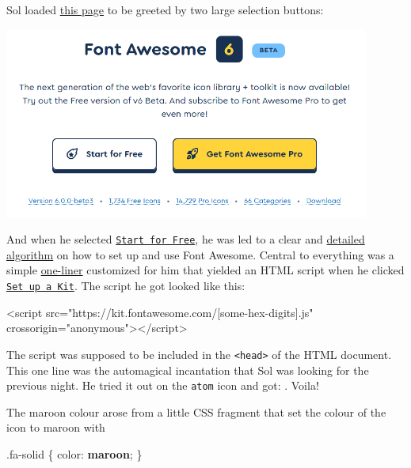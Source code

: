 \documentclass[
  british,
  a4paper,
  rgb,
  dvipsnames,
  svgnames,
  hyphens]{article}
\newenvironment{Shaded}{\begin{snugshade}}{\end{snugshade}}
\newcommand{\ConstantTok}[1]{\textcolor[rgb]{0.86,0.64,0.64}{\textbf{#1}}}
\newcommand{\ErrorTok}[1]{\textcolor[rgb]{0.76,0.75,0.62}{#1}}
\newcommand{\FunctionTok}[1]{\textcolor[rgb]{0.94,0.94,0.56}{#1}}
\newcommand{\KeywordTok}[1]{\textcolor[rgb]{0.94,0.87,0.69}{#1}}
\newcommand{\NormalTok}[1]{\textcolor[rgb]{0.80,0.80,0.80}{#1}}
\newcommand{\OperatorTok}[1]{\textcolor[rgb]{0.94,0.94,0.82}{#1}}
\newcommand{\OtherTok}[1]{\textcolor[rgb]{0.94,0.94,0.56}{#1}}
\newcommand{\StringTok}[1]{\textcolor[rgb]{0.80,0.58,0.58}{#1}}
\begin{document}
Sol loaded \href{https://fontawesome.com/v6.0}{this page} to be greeted
by two large selection buttons:

\includegraphics[width=0.9\textwidth,height=\textheight]{images/start-for-free.png}

And when he selected
\href{https://fontawesome.com/v6.0/docs/web/setup/quick-start}{\texttt{Start\ for\ Free}},
he was led to a clear and
\href{https://fontawesome.com/v6.0/docs/web/setup/quick-start}{detailed
algorithm} on how to set up and use Font Awesome. Central to everything
was a simple
\href{https://en.wikipedia.org/wiki/One-liner_program}{one-liner}
customized for him that yielded an HTML script when he clicked
\href{https://fontawesome.com/kits}{\texttt{Set\ up\ a\ Kit}}. The
script he got looked like this:

\begin{Shaded}
\begin{Highlighting}[]
\KeywordTok{\textless{}script} \ErrorTok{src}\OtherTok{=}\StringTok{"https://kit.fontawesome.com/[some{-}hex{-}digits].js"}
\OtherTok{    crossorigin=}\StringTok{"anonymous"}\KeywordTok{\textgreater{}\textless{}/script\textgreater{}}
\end{Highlighting}
\end{Shaded}

The script was supposed to be included in the
\texttt{\textless{}head\textgreater{}} of the HTML document. This one
line was the automagical incantation that Sol was looking for the
previous night. He tried it out on the \texttt{atom} icon and got: .
Voila!

The maroon colour arose from a little CSS fragment that set the colour
of the icon to maroon with

\begin{Shaded}
\begin{Highlighting}[]
\FunctionTok{.fa{-}solid}\NormalTok{ \{}
    \KeywordTok{color}\NormalTok{: }\ConstantTok{maroon}\OperatorTok{;}
\NormalTok{\}}
\end{Highlighting}
\end{Shaded}
\end{document}
